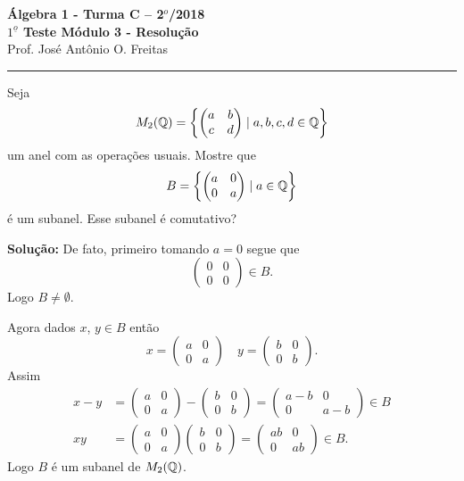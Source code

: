 \documentclass[12pt]{article}
\begin{document}


\begin{center}
{\Large\bf {\'A}lgebra 1 - Turma C -- 2$^{o}$/2018} \\ \vspace{9pt} {\large\bf
  $1^{\underline{o}}$ Teste Módulo 3 - Resolu\c{c}\~ao}\\
\vspace{9pt} Prof. Jos{\'e} Ant{\^o}nio O. Freitas
\end{center}
\hrule

\vspace{.6cm}

\questao Seja
\[
	M_2(\mathbb{Q}) = \left\{ \begin{pmatrix}
		a & b\\c & d
	\end{pmatrix} \mid a,b,c,d \in \mathbb{Q}\right\}
\]
um anel com as operações usuais. Mostre que
\[
	B = \left\{ \begin{pmatrix}
		a & 0\\0 & a
	\end{pmatrix} \mid a \in \mathbb{Q}\right\}	
\]
é um subanel. Esse subanel é comutativo?

\noindent\textbf{Solu\c{c}\~ao:} De fato, primeiro tomando $a = 0$ segue que
\[
	\begin{pmatrix}
		0 & 0\\0 & 0
	\end{pmatrix} \in B.
\]
Logo $B \ne \emptyset$.

Agora dados $x$, $y \in B$ então
\[
	x = \begin{pmatrix}
		a & 0\\0 & a
	\end{pmatrix}\quad y = \begin{pmatrix}
		b & 0\\0 & b
	\end{pmatrix}.
\]
Assim
\begin{align*}
	x - y &= \begin{pmatrix}
		a & 0\\0 & a
	\end{pmatrix} - \begin{pmatrix}
		b & 0\\0 & b
	\end{pmatrix} = \begin{pmatrix}
		a - b & 0\\0 & a - b
	\end{pmatrix} \in B\\
	xy &= \begin{pmatrix}
		a & 0\\0 & a
	\end{pmatrix}\begin{pmatrix}
		b & 0\\0 & b
	\end{pmatrix} = \begin{pmatrix}
		ab & 0\\0 & ab
	\end{pmatrix} \in B.
\end{align*}
Logo $B$ é um subanel de $M_2(\mathbb{Q})$.
\end{document}

